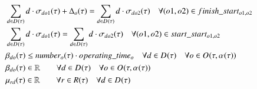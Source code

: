 \begin{alignat}{2}
	& \sum_{\ElementDays \in \SetDays{}} \ElementDays \cdot \VarTacticalWorkBinary{\ElementDays}{\ElementOperation1} + \VarTacticalOperationDifference  = \sum_{\ElementDays \in \SetDays{}} \ElementDays \cdot \VarTacticalWorkBinary{\ElementDays}{\ElementOperation2}  \quad \forall (o1, \ElementOperation2) \in \ParFinishStart                                                                                                                                                                                                                                 \\ 
	& \sum_{\ElementDays \in \SetDays{}} \ElementDays \cdot \VarTacticalWorkBinary{\ElementDays}{\ElementOperation1} = \sum_{\ElementDays \in \SetDays{}} \ElementDays \cdot \VarTacticalWorkBinary{\ElementDays}{\ElementOperation2}                                     \quad \forall (o1, \ElementOperation2) \in \ParStartStart                                                                                                                                                                                                                                  \\ 
	& \VarTacticalWork{\ElementDays}{\ElementOperation} \leq \ParNumberOfPeople \cdot \ParOperatingTime                                                                                                                                                                   \quad \forall \ElementDays \in \SetDays{} \quad \forall \ElementOperation \in \SetOperation{}{\VarStrategicWorkOrderAssignment{}{}}                                                                                                                                                        \\
	& \VarTacticalWork{\ElementDays}{\ElementOperation} \in \mathbb{R} \quad                                                                                                                                                                                            \quad \forall \ElementDays \in \SetDays{} \quad \forall \ElementOperation \in \SetOperation{}{\VarStrategicWorkOrderAssignment{}{}}                                                                                                                                                        \\
	& \VarTacticalExcess \in \mathbb{R} \quad                                                                                                                                                                                                                           \quad \forall r \in \SetResource \quad \forall \ElementDays \in \SetDays{}                                                                                                                                                                                                                 \\

\end{alignat}
